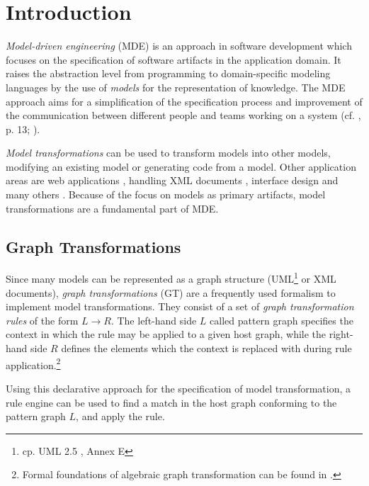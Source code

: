 \chapter{Introduction}
\label{introduction}

\textit{Model-driven engineering} (MDE) is an approach in software development which focuses on the specification of software artifacts in the application domain.
It raises the abstraction level from programming to domain-specific modeling languages by the use of \textit{models} for the representation of knowledge.
The MDE approach aims for a simplification of the specification process and improvement of the communication between different people and teams working on a system (cf. \cite{MDEVoelter}, p. 13; \cite{HerringMernikWhenAndHowDevelopDSLs}).

\textit{Model transformations} can be used to transform models into other models, \eg modifying an existing model or generating code from a model.
Other application areas are web applications \cite{ModelTransformationsWithinWebApplications}, handling XML documents \cite{KurtevXMLApplicationsWithModelTransformations}, interface design and many others \cite{BxTransformationsCrossDisciplinePerspective}.
Because of the focus on models as primary artifacts, model transformations are a fundamental part of MDE.

\section{Graph Transformations}
\label{graph-transformations}
Since many models can be represented as a graph structure (\eg UML\footnote{cp. UML 2.5 \cite{UMLSpecification}, Annex E} or XML documents), \textit{graph transformations} (GT) are a frequently used formalism to implement model transformations.
They consist of a set of \textit{graph transformation rules} of the form $L \rightarrow R$.
The left-hand side $L$ called pattern graph specifies the context in which the rule may be applied to a given host graph, while the right-hand side $R$ defines the elements which the context is replaced with during rule application.\footnote{Formal foundations of algebraic graph transformation can be found in \cite{FundamentalsOfAlgebraicGT}.}

Using this declarative approach for the specification of model transformation, a rule engine can be used to find a match in the host graph conforming to the pattern graph $L$, and apply the rule.

